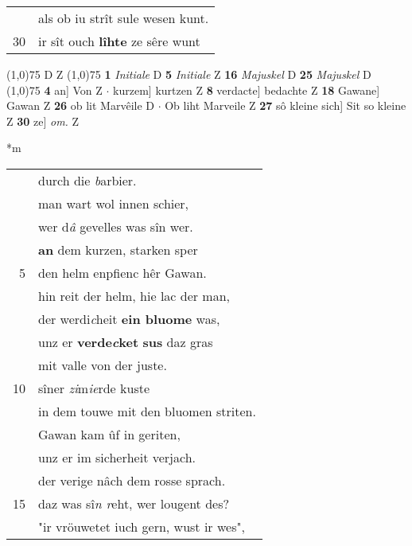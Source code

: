 \documentclass[8pt,a4paper,notitlepage]{article}
\begin{document}
\begin{table}[ht]
\begin{minipage}[t]{0.5\linewidth}
\begin{tabular}{rl}
 & als ob iu strît sule wesen kunt.\\ 
30 & ir sît ouch \textbf{lîhte} ze sêre wunt\\ 
\end{tabular}
\scriptsize
\line(1,0){75} \newline
D Z \newline
\line(1,0){75} \newline
\textbf{1} \textit{Initiale} D  \textbf{5} \textit{Initiale} Z  \textbf{16} \textit{Majuskel} D  \textbf{25} \textit{Majuskel} D  \newline
\line(1,0){75} \newline
\textbf{4} an] Von Z  $\cdot$ kurzem] kurtzen Z \textbf{8} verdacte] bedachte Z \textbf{18} Gawane] Gawan Z \textbf{26} ob lit Marvêile D  $\cdot$ Ob liht Marveile Z \textbf{27} sô kleine sich] Sit so kleine Z \textbf{30} ze] \textit{om.} Z \newline
\end{minipage}
\hspace{0.5cm}
\begin{minipage}[t]{0.5\linewidth}
\small
\begin{center}*m
\end{center}
\begin{tabular}{rl}
 & durch die \textit{b}arbier.\\ 
 & man wart wol innen schier,\\ 
 & wer d\textit{â} gevelles was sîn wer.\\ 
 & \textbf{an} dem kurzen, starken sper\\ 
5 & den helm enpfienc hêr Gawan.\\ 
 & hin reit der helm, hie lac der man,\\ 
 & der werdi\textit{c}heit \textbf{ein bluome} was,\\ 
 & unz er \textbf{verde\textit{c}ket} \textbf{sus} daz gras\\ 
 & mit valle von der juste.\\ 
10 & sîner \textit{zi}m\textit{ie}rde kuste\\ 
 & in dem touwe mit den bluomen striten.\\ 
 & Gawan kam ûf in geriten,\\ 
 & unz er im sicherheit verjach.\\ 
 & der verige nâch dem rosse sprach.\\ 
15 & daz was sî\textit{n r}eht, wer lougent des?\\ 
 & "ir vröuwetet iuch gern, wust ir wes",\\ 

\end{tabular}
\end{minipage}
\end{table}
\end{document}

